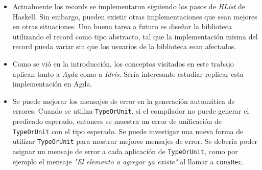 \begin{itemize}
\item Actualmente los records se implementaron siguiendo los pasos de \textit{HList} de Haskell. Sin embargo, pueden existir otras implementaciones que sean mejores en otras situaciones. Una buena tarea a futuro es diseñar la biblioteca utilizando el record como tipo abstracto, tal que la implementación misma del record pueda variar sin que los usuarios de la biblioteca sean afectados. 
\item Como se vió en la introducción, los conceptos visitados en este trabajo aplican tanto a \textit{Agda} como a \textit{Idris}. Sería interesante estudiar replicar esta implementación en Agda.
\item Se puede mejorar los mensajes de error en la generación automática de errores. Cuando se utiliza \texttt{TypeOrUnit}, si el compilador no puede generar el predicado esperado, entonces se muestra un error de unificación de \texttt{TypeOrUnit} con el tipo esperado. Se puede investigar una nueva forma de utilizar \texttt{TypeOrUnit} para mostrar mejores mensajes de error. Se debería poder asignar un mensaje de error a cada aplicación de \texttt{TypeOrUnit}, como por ejemplo el mensaje \textit{"El elemento a agregar ya existe"} al llamar a \texttt{consRec}.
\end{itemize}
